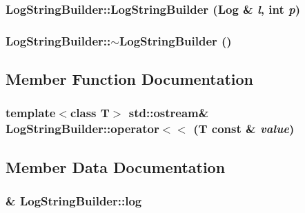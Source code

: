 \subsubsection{\setlength{\rightskip}{0pt plus 5cm}Log\-String\-Builder::Log\-String\-Builder ({\bf Log} \& {\em l}, int {\em p})}\label{classLogStringBuilder_a9393394f93ca644c8a851fb8fe04e24}


\subsubsection{\setlength{\rightskip}{0pt plus 5cm}Log\-String\-Builder::$\sim$Log\-String\-Builder ()}\label{classLogStringBuilder_c63707864e0005008cc4a67d8dec9933}




\subsection{Member Function Documentation}
\subsubsection{\setlength{\rightskip}{0pt plus 5cm}template$<$class T$>$ std::ostream\& Log\-String\-Builder::operator$<$$<$ (T const \& {\em value})\hspace{0.3cm}{\tt  [inline]}}\label{classLogStringBuilder_9b4f26f5e64aacc172c0818073117e42}




\subsection{Member Data Documentation}
\subsubsection{\& {\bf Log\-String\-Builder::log}\hspace{0.3cm}{\tt  [private]}}\label{classLogStringBuilder_499c5b058df61e2215368592d21aacf1}


